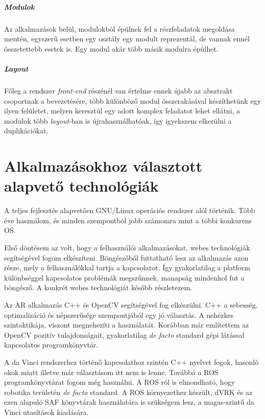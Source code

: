 \documentclass[12pt,a4paper,oneside]{report} %
\begin{document}
\subparagraph{Modulok}
Az alkalmazások belül, modulokból épülnek fel a részfeladatok megoldása mentén, egyszerű esetben egy osztály egy modult reprezentál, de vannak ennél összetettebb esetek is. Egy modul akár több másik modulra épülhet.

\subparagraph{Layout}
Főleg a rendszer \textit{front-end} részénél van értelme ennek újabb az absztrakt csoportnak a bevezetésére, több különböző modul összerakásával készíthetünk egy ilyen felületet, melyen keresztül egy adott komplex feladatot lehet ellátni, a modulok több \textit{layout}-ban is újrahasználhatóak, így igyekszem elkerülni a duplikációkat.


\section{Alkalmazásokhoz választott alapvető technológiák}
A teljes fejlesztés alapvetően GNU/Linux operációs rendszer alól történik. Több éve használom, és minden szempontból jobb számomra mint a többi konkurens OS.
\par Első döntésem az volt, hogy a felhasználói alkalmazásokat, webes technológiák segítségével fogom elkészíteni. Böngészőből futtatható lesz  az alkalmazás azon része, mely a felhasználókkal tartja a kapcsolatot. Így gyakorlatilag a platform különbséggel kapcsolatos problémák megszűnnek, manapság mindenhol fut a böngésző. A konkrét webes technológiát később részletezem. 
\par Az AR alkalmazás C++ és OpenCV segítségével fog elkészülni. C++ a sebesség, optimalizáció és népszerűsége szempontjából egy jó választás. A nehézkes szintaktikája, viszont megnehezíti a használatát. Korábban már említettem az OpenCV pozitív tulajdonságait, gyakorlatilag \textit{de facto} standard gépi látással kapcsolatos programkönyvtár. 
\par A da Vinci rendszerhez történő kapcsolathoz szintén C++ nyelvet fogok, hasonló okok miatt illetve már választásom itt nem is lenne. Továbbá a ROS  programkönyvtárat fogom még használni.  A ROS ról is elmondható, hogy robotika területén \textit{de facto} standard. A ROS környezethez készült, dVRK és az ezen alapuló SAF könyvtárak használatára is szükségem lesz, a magas-szintű da Vinci utasítások kiadására. 
\end{document}
